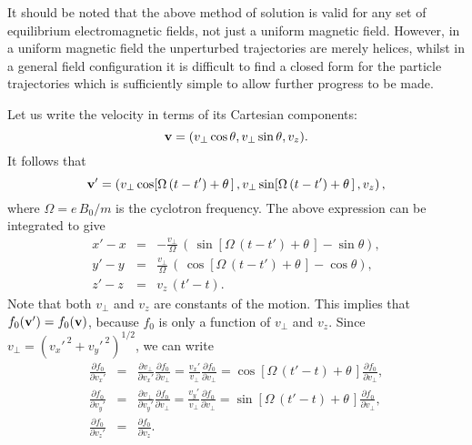It should be noted that the above method of solution is valid for any
set of equilibrium electromagnetic fields, not just a uniform magnetic
field. However, in a uniform magnetic field the unperturbed trajectories
are merely helices, whilst in a general field configuration it is difficult to
find a closed form for the particle trajectories which is sufficiently
simple to allow further progress to be made.

Let us write the velocity in terms of its Cartesian components:
\begin{equation}
{\bf v} =
(v_\perp\cos\theta, v_\perp\sin\theta, v_z).
\end{equation}
 It follows that
\begin{equation}\label{e6.58}
{\bf v}' = \left( v_\perp\cos\!\left[{\Omega}\,(t-t')+\theta\,\right],
 v_\perp\sin\!\left[{\Omega}\,(t-t')+\theta\,\right], v_z\right),
\end{equation}
where ${\Omega} = e\,B_0/m$ is the cyclotron frequency. The above
expression can be integrated to give
\begin{eqnarray}\label{e6.59a}
x'-x &=& -\frac{v_\perp}{{\Omega}}\,\left(\,\sin\!\left[{\Omega}\,(t-t')
+\theta\,\right] -\sin\theta\right),\\[0.5ex]\label{e6.59b}
y'-y &=& \frac{v_\perp}{{\Omega}}\,\left(\,\cos\!\left[{\Omega}\,(t-t')
+\theta\,\right] -\cos\theta\right),\\[0.5ex]\label{e6.59c}
z'-z &=& v_z\,(t'-t).
\end{eqnarray}
Note that both $v_\perp$ and $v_z$ are constants of the motion. This
implies that $f_0({\bf v}') = f_0({\bf v})$, because $f_0$ is only a
function of $v_\perp$ and $v_z$. Since $v_\perp = (v_x'^{~2} + v_y'^{~2})^{1/2}$,
we can write
\begin{eqnarray}\label{e6.60a}
\frac{\partial f_0}{\partial v_x'}& =& \frac{\partial v_\perp}{\partial v_x'}
\frac{\partial f_0}{\partial v_\perp} = \frac{v_x'}{v_\perp}\frac{\partial f_0}
{\partial v_\perp} = \cos\left[{\Omega}\,(t'-t)+\theta\,\right]
\frac{\partial f_0}{\partial v_\perp},\\[0.5ex]
\frac{\partial f_0}{\partial v_y'}& =& \frac{\partial v_\perp}{\partial v_y'}
\frac{\partial f_0}{\partial v_\perp} = \frac{v_y'}{v_\perp}\frac{\partial f_0}
{\partial v_\perp} = \sin\left[{\Omega}\,(t'-t)+\theta\,\right]
\frac{\partial f_0}{\partial v_\perp},\\[0.5ex]
\frac{\partial f_0}{\partial v_z'} &=& \frac{\partial f_0}{\partial v_z}.\label{e6.60c}
\end{eqnarray}

